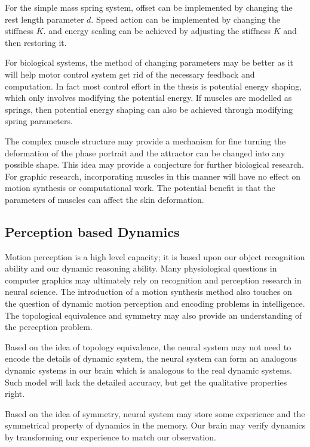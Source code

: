 For the simple  mass spring system,
offset can be implemented by changing the rest length parameter $d$.
Speed action can be implemented by changing the stiffness $K$.
and energy scaling can be achieved by adjusting the stiffness $K$ and then restoring it.
 



For biological systems, the method of changing parameters  may be better as it will help motor control system get rid of the necessary feedback and computation. 
In fact most control effort in the thesis is potential energy shaping, which only involves  modifying the potential energy.
If muscles are modelled as springs, then potential energy shaping can also be achieved through modifying spring parameters.

The complex muscle structure may provide a mechanism for fine turning the deformation of the phase portrait and  the attractor can be changed into any possible shape.
This idea may provide a conjecture for further biological research.
For graphic research, incorporating muscles in this manner will have no effect on motion synthesis or computational work.
The potential benefit is that the parameters of muscles can affect the skin deformation.



\subsection{Perception based Dynamics}
Motion perception is a high level capacity; it is based upon our object recognition ability and our dynamic reasoning ability.
Many physiological questions in computer graphics may ultimately rely on recognition and perception research in neural science.
The introduction of a motion synthesis method also touches on  the question of dynamic motion perception and encoding problems in intelligence.
The topological equivalence and symmetry may also provide an understanding of the perception problem.

Based on the idea of topology equivalence, the neural system may not need to encode the details of dynamic system, the neural system can form an analogous dynamic systems in our brain which is analogous to the real dynamic systems.
Such model will lack the detailed accuracy, but get the qualitative properties right.

Based on the idea of symmetry, neural system may store some experience and the symmetrical property of dynamics in the memory.
Our brain may verify dynamics by transforming our experience to match our observation.


